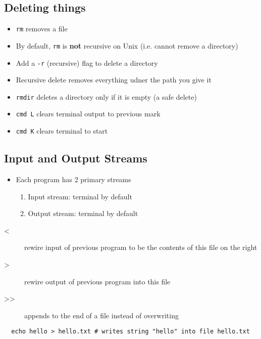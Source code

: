 \documentclass[letterpaper,12pt]{article}
\begin{document}
\subsection{Deleting things}
\begin{itemize}
 \item \lstinline{rm} removes a file
 \item By default, \lstinline{rm} is \textbf{not} recursive on Unix (i.e. cannot remove a directory)
 \item Add a \lstinline{-r} (recursive) flag to delete a directory
 \item Recursive delete removes everything udner the path you give it
\end{itemize}

\begin{itemize}
 \item \lstinline{rmdir} deletes a directory only if it is empty (a safe delete)
 \item \lstinline{cmd L} clears terminal output to previous mark
 \item \lstinline{cmd K} clears terminal to start
\end{itemize}


\subsection{Input and Output Streams}
\begin{itemize}
 \item Each program has 2 primary streams
       \begin{enumerate}
        \item Input stream: terminal by default
        \item Output stream: terminal by default
       \end{enumerate}
\end{itemize}

\begin{description}
 \item[<] rewire input of previous program to be the contents of this file on the right
 \item[>] rewire output of previous program into this file
 \item[>>] appends to the end of a file instead of overwriting
\end{description}

\begin{lstlisting}
  echo hello > hello.txt # writes string "hello" into file hello.txt
\end{lstlisting}
\end{document}
